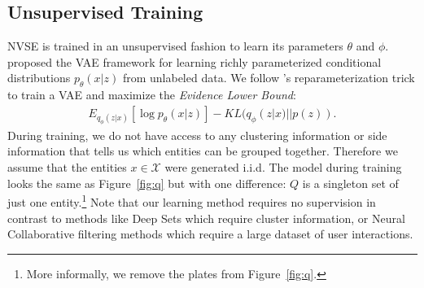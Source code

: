 \documentclass[a4paper]{article}
\newcommand{\figref}[1]{Figure~\ref{#1}}
\newcommand{\cNc}{\mathcal{N}_c}
\newcommand{\cQ}{\mathcal{Q}}
\newcommand{\cX}{\mathcal{X}}
\newcommand{\ta}{\theta}
\newcommand{\nvge}{NVSE\xspace}
\newcommand{\mynewcite}[1]{\cite{#1}}%
\newcommand{\myciteauthor}[1]{\cite{#1}}%
\begin{document}

\subsection{Unsupervised Training}
\label{sec:est}
\nvge is trained in an unsupervised fashion to learn its parameters $\theta$ and $\phi$.
\mynewcite{kingma2013auto,rezende2014stochastic} proposed the VAE framework for
learning richly parameterized conditional distributions $p_\ta(x | z)$ from unlabeled data.
We follow \myciteauthor{kingma2013auto}'s reparameterization trick to train a VAE and maximize
the \textit{Evidence Lower Bound}:
\begin{align}
  E_{q_\phi(z | x)}[\log p_\theta(x | z)] - KL(q_\phi(z|x) || p(z)).\label{bound:vae}
\end{align}
During training, we do not have access to any clustering information or side information that tells us which entities can be grouped together.
Therefore we assume that the entities $x \in \cX$ were generated i.i.d. 
The model during training looks the same as \figref{fig:q} but with one difference: $Q$ is a singleton set of just one
entity.\footnote{More informally, we remove the plates from \figref{fig:q}.} %
Note that our learning method requires no supervision in contrast to methods like Deep Sets which require cluster information, or Neural Collaborative filtering methods which require a large dataset of user interactions.
\end{document}
